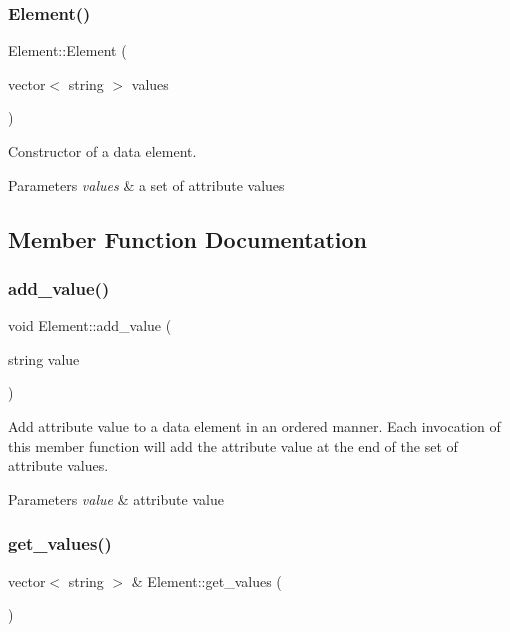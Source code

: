 \subsubsection{\texorpdfstring{Element()}{Element()}\hspace{0.1cm}{\footnotesize\ttfamily [3/3]}}
{\footnotesize\ttfamily Element\+::\+Element (\begin{DoxyParamCaption}\item[{vector$<$ string $>$}]{values }\end{DoxyParamCaption})\hspace{0.3cm}{\ttfamily [inline]}}

Constructor of a data element. 
\begin{DoxyParams}{Parameters}
{\em values} & a set of attribute values \\
\hline
\end{DoxyParams}


\subsection{Member Function Documentation}
\mbox{\label{classElement_a67439f02d44fb2fa834d9a7b223709a8}} 
\subsubsection{\texorpdfstring{add\+\_\+value()}{add\_value()}}
{\footnotesize\ttfamily void Element\+::add\+\_\+value (\begin{DoxyParamCaption}\item[{string}]{value }\end{DoxyParamCaption})}

Add attribute value to a data element in an ordered manner. Each invocation of this member function will add the attribute value at the end of the set of attribute values. 
\begin{DoxyParams}{Parameters}
{\em value} & attribute value \\
\hline
\end{DoxyParams}
\mbox{\label{classElement_ae1c0e14049aaa6b7a9c047039038de3a}} 
\subsubsection{\texorpdfstring{get\+\_\+values()}{get\_values()}}
{\footnotesize\ttfamily vector$<$ string $>$ \& Element\+::get\+\_\+values (\begin{DoxyParamCaption}{ }\end{DoxyParamCaption})}

